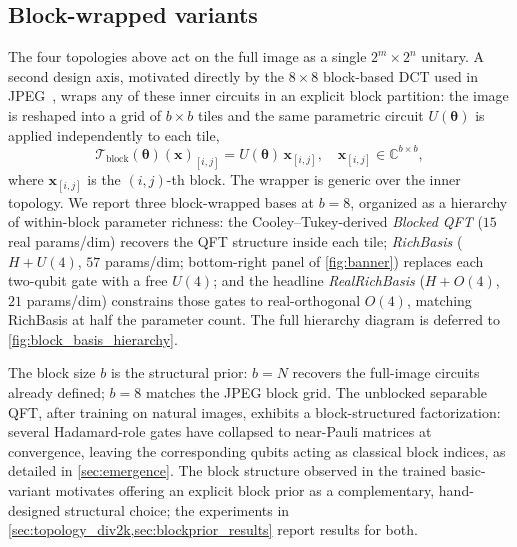 \documentclass[a4paper, twocolumn]{quantumarticle}
\newcommand{\CC}{\mathbb{C}}
\newcommand{\TT}{\mathcal{T}}
\begin{document}
\subsection{Block-wrapped variants}
\label{sec:block_wrapper}

The four topologies above act on the full image as a single $2^m \times 2^n$ unitary.
A second design axis, motivated directly by the $8 \times 8$ block-based DCT used in JPEG~\cite{wallace1992jpeg}, wraps any of these inner circuits in an explicit block partition: the image is reshaped into a grid of $b \times b$ tiles and the same parametric circuit $U(\boldsymbol{\theta})$ is applied independently to each tile,
\begin{equation}
  \TT_{\text{block}}(\boldsymbol{\theta})(\mathbf{x})_{[i,j]}
  = U(\boldsymbol{\theta})\, \mathbf{x}_{[i,j]},
  \quad \mathbf{x}_{[i,j]} \in \CC^{b \times b},
  \label{eq:block_wrapper}
\end{equation}
where $\mathbf{x}_{[i,j]}$ is the $(i,j)$-th block.
The wrapper is generic over the inner topology. We report three block-wrapped bases at $b = 8$, organized as a hierarchy of within-block parameter richness: the Cooley--Tukey-derived \emph{Blocked QFT} ($15$ real params/dim) recovers the QFT structure inside each tile; \emph{RichBasis} ($H + U(4)$, $57$ params/dim; bottom-right panel of \cref{fig:banner}) replaces each two-qubit gate with a free $U(4)$; and the headline \emph{RealRichBasis} ($H + O(4)$, $21$ params/dim) constrains those gates to real-orthogonal $O(4)$, matching RichBasis at half the parameter count. The full hierarchy diagram is deferred to \cref{fig:block_basis_hierarchy}.

The block size $b$ is the structural prior: $b = N$ recovers the full-image circuits already defined; $b = 8$ matches the JPEG block grid.
The unblocked separable QFT, after training on natural images, exhibits a block-structured factorization: several Hadamard-role gates have collapsed to near-Pauli matrices at convergence, leaving the corresponding qubits acting as classical block indices, as detailed in \cref{sec:emergence}.
The block structure observed in the trained basic-variant motivates offering an explicit block prior as a complementary, hand-designed structural choice; the experiments in \cref{sec:topology_div2k,sec:blockprior_results} report results for both.
\end{document}

